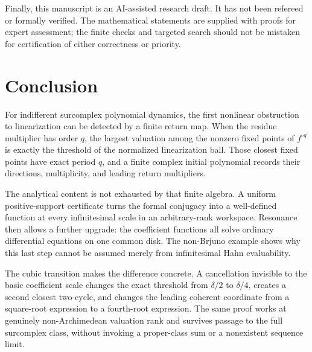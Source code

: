 \documentclass[11pt,letterpaper]{article}
\numberwithin{equation}{section}
\theoremstyle{plain}
\theoremstyle{definition}
\theoremstyle{remark}
\begin{document}
Finally, this manuscript is an AI-assisted research draft. It has not been
refereed or formally verified. The mathematical statements are supplied with
proofs for expert assessment; the finite checks and targeted search should
not be mistaken for certification of either correctness or priority.

\section{Conclusion}

For indifferent surcomplex polynomial dynamics, the first nonlinear
obstruction to linearization can be detected by a finite return map. When
the residue multiplier has order $q$, the largest valuation among the nonzero
fixed points of $f^{\circ q}$ is exactly the threshold of the normalized
linearization ball. Those closest fixed points have exact period $q$, and a
finite complex initial polynomial records their directions, multiplicity,
and leading return multipliers.

The analytical content is not exhausted by that finite algebra. A uniform
positive-support certificate turns the formal conjugacy into a well-defined
function at every infinitesimal scale in an arbitrary-rank workspace.
Resonance then allows a further upgrade: the coefficient functions all solve
ordinary differential equations on one common disk. The non-Brjuno example
shows why this last step cannot be assumed merely from infinitesimal Hahn
evaluability.

The cubic transition makes the difference concrete. A cancellation invisible
to the basic coefficient scale changes the exact threshold from $\delta/2$
to $\delta/4$, creates a second closest two-cycle, and changes the leading
coherent coordinate from a square-root expression to a fourth-root
expression. The same proof works at genuinely non-Archimedean valuation
rank and survives passage to the full surcomplex class, without invoking a
proper-class sum or a nonexistent sequence limit.
\end{document}

